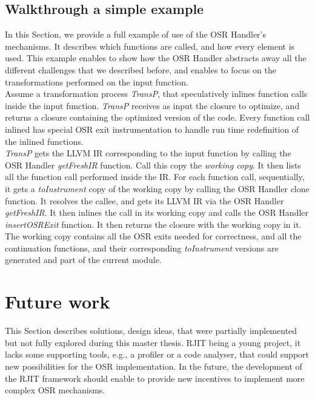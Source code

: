 \subsection{Walkthrough a simple example}
In this Section, we provide a full example of use of the OSR Handler's mechanisms.
It describes which functions are called, and how every element is used.
This example enables to show how the OSR Handler abstracts away all the different challenges that we described before, and enables to focus on the transformations performed on the input function.\\

Assume a transformation process \textit{TransP}, that speculatively inlines function calls inside the input function. 
\textit{TransP} receives as input the closure to optimize, and returns a closure containing the optimized version of the code.
Every function call inlined has special OSR exit instrumentation to handle run time redefinition of the inlined functions.\\

\textit{TransP} gets the LLVM IR corresponding to the input function by calling the OSR Handler \textit{getFreshIR} function.
Call this copy the \textit{working copy}.
It then lists all the function call performed inside the IR.
For each function call, sequentially, it gets a \textit{toInstrument} copy of the working copy by calling the OSR Handler clone function.
It resolves the callee, and gets its LLVM IR via the OSR Handler \textit{getFreshIR}.
It then inlines the call in its working copy and calls the OSR Handler \textit{insertOSRExit} function.
It then returns the closure with the working copy in it.
The working copy contains all the OSR exits needed for correctness, and all the continuation functions, and their corresponding \textit{toInstrument} versions are generated and part of the current module.\\


\section{Future work}
This Section describes solutions, design ideas, that were partially implemented but not fully explored during this master thesis.
RJIT being a young project, it lacks some supporting tools, e.g., a profiler or a code analyser, that could support new possibilities for the OSR implementation.
In the future, the development of the RJIT framework should enable to provide new incentives to implement more complex OSR mechanisms.\\

